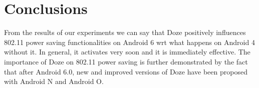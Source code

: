 \documentclass[11pt, a4paper]{article}
\begin{document}
	\section{Conclusions}
	
	From the results of our experiments we can say that Doze positively influences 802.11 power saving functionalities on Android 6 wrt what happens on Android 4 without it. In general, it activates very soon and it is immediately effective. The importance of Doze on 802.11 power saving is further demonstrated by the fact that after Android 6.0, new and improved versions of Doze have been proposed with Android N and Android O.
	
\end{document}
